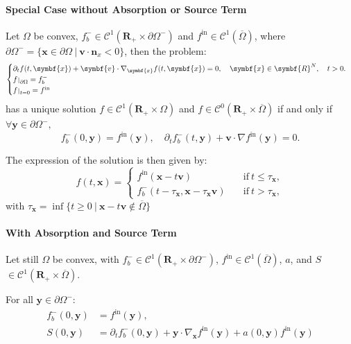 \documentclass[a4paper, 11pt]{article}
\newcommand{\bm}{\symbf}
\def\restriction#1#2{\mathchoice
	{\setbox1\hbox{${\displaystyle #1}_{\scriptstyle #2}$}
		\restrictionaux{#1}{#2}}
	{\setbox1\hbox{${\textstyle #1}_{\scriptstyle #2}$}
		\restrictionaux{#1}{#2}}
	{\setbox1\hbox{${\scriptstyle #1}_{\scriptscriptstyle #2}$}
		\restrictionaux{#1}{#2}}
	{\setbox1\hbox{${\scriptscriptstyle #1}_{\scriptscriptstyle #2}$}
		\restrictionaux{#1}{#2}}}
\def\restrictionaux#1#2{{#1\,\smash{\vrule height .8\ht1 depth .85\dp1}}_{\,#2}}
\begin{document}
\paragraph{Special Case without Absorption or Source Term}

Let $\Omega$ be convex, $f_b^- \in \mathcal{C}^1(\bm{R}_+ \times \partial \Omega^-)$ and $f^{\mathrm{in}} \in \mathcal{C}^1(\overline{\Omega})$, where $\partial \Omega^- = \{\bm{x}\in\partial \Omega~ | ~ \bm{v}\cdot \bm{n}_x<0\}$, then the problem:
\[
\begin{cases}
\partial_t f(t,\bm{x})+\bm{v} \cdot \nabla_{\bm{x}} f(t,\bm{x})=0, \quad \bm{x} \in \bm{R}^N, \quad t>0.\\
\restriction{f}{\partial \Omega}= f_b^-\\
\restriction{f}{t=0}= f^{\mathrm{in}}
\end{cases}
\]
has a unique solution $f \in \mathcal{C}^1(\bm{R}_+ \times \Omega)$ and $f \in \mathcal{C}^0(\bm{R}_+ \times \overline{\Omega})$ if and only if $\forall \bm{y} \in \partial \Omega^-,$
\[ f_b^-(0,\bm{y}) = f^{\mathrm{in}}(\bm{y}), \quad \partial_t f_b^-(t,\bm{y})+\bm{v} \cdot \nabla f^{\mathrm{in}}(\bm{y})=0. \]

The expression of the solution is then given by: 
\[
f(t,\bm{x})= 
\begin{cases}
f^{\mathrm{in}}(\bm{x}-t\bm{v}) \quad &\mathrm{if}~ t \leq \tau_{\bm{x}} ,\\
f_b^-(t-\tau_{\bm{x}},\bm{x}-\tau_{\bm{x}}\bm{v}) \quad &\mathrm{if}~ t > \tau_{\bm{x}} ,
\end{cases}
\]
with $\tau_{\bm{x}}= \inf \{t \geq 0~ | ~ \bm{x}-t\bm{v} \notin \overline{\Omega}\}$

\paragraph{With Absorption and Source Term}

Let still $\Omega$ be convex, with $f_b^- \in \mathcal{C}^1(\bm{R}_+ \times \partial \Omega^-)$, $f^{\mathrm{in}} \in \mathcal{C}^1(\overline{\Omega})$, $a$, and $S$ $\in \mathcal{C}^1(\bm{R}_+ \times \overline{\Omega})$. 
\medbreak

For all $\bm{y} \in \partial \Omega^-$:
\[
\begin{aligned}
f_b^-(0,\bm{y}) &= f^{\mathrm{in}}(\bm{y}), \\
S(0,\bm{y}) &= \partial_t f_b^-(0,\bm{y}) + \bm{y} \cdot \nabla_{\bm{x}} f^{\mathrm{in}}(\bm{y}) + a(0,\bm{y})f^{\mathrm{in}}(\bm{y})
\end{aligned}
\]
\end{document}
